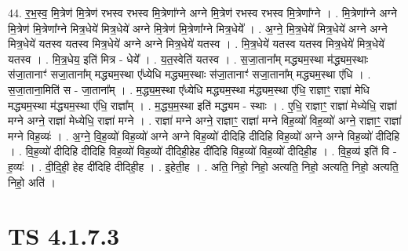 \documentclass[17pt]{extarticle}
\begin{document}
44. र॒भ॒स्व॒ मि॒त्रेण॑ मि॒त्रेण॑ रभस्व रभस्व मि॒त्रेणा᳚ग्ने अग्ने मि॒त्रेण॑ रभस्व रभस्व मि॒त्रेणा᳚ग्ने । . मि॒त्रेणा᳚ग्ने अग्ने मि॒त्रेण॑ मि॒त्रेणा᳚ग्ने मित्र॒धेये॑ मित्र॒धेये॑ अग्ने मि॒त्रेण॑ मि॒त्रेणा᳚ग्ने मित्र॒धेये᳚ । . अ॒ग्ने॒ मि॒त्र॒धेये॑ मित्र॒धेये॑ अग्ने अग्ने मित्र॒धेये॑ यतस्व यतस्व मित्र॒धेये॑ अग्ने अग्ने मित्र॒धेये॑ यतस्व । . मि॒त्र॒धेये॑ यतस्व यतस्व मित्र॒धेये॑ मित्र॒धेये॑ यतस्व । . मि॒त्र॒धेय॒ इति॑ मित्र - धेये᳚ । . य॒त॒स्वेति॑ यतस्व । . स॒जा॒ताना᳚म् मद्ध्यम॒स्था म॑द्ध्यम॒स्थाः स॑जा॒तानाꣳ॑ सजा॒ताना᳚म् मद्ध्यम॒स्था 
ए᳚ध्येधि मद्ध्यम॒स्थाः स॑जा॒तानाꣳ॑ सजा॒ताना᳚म् मद्ध्यम॒स्था ए॑धि । . स॒जा॒ताना॒मिति॑ स - जा॒ताना᳚म् । . म॒द्ध्य॒म॒स्था ए᳚ध्येधि मद्ध्यम॒स्था म॑द्ध्यम॒स्था ए॑धि॒ राज्ञाꣳ॒॒ राज्ञा॑ मेधि मद्ध्यम॒स्था म॑द्ध्यम॒स्था ए॑धि॒ राज्ञा᳚म् । . म॒द्ध्य॒म॒स्था इति॑ मद्ध्यम - स्थाः । . ए॒धि॒ राज्ञाꣳ॒॒ राज्ञा॑ मेध्येधि॒ राज्ञा॑ मग्ने अग्ने॒ राज्ञा॑ मेध्येधि॒ राज्ञा॑ मग्ने । . राज्ञा॑ मग्ने अग्ने॒ राज्ञाꣳ॒॒ राज्ञा॑ मग्ने विह॒व्यो॑ विह॒व्यो॑ अग्ने॒ राज्ञाꣳ॒॒ राज्ञा॑ मग्ने विह॒व्यः॑ । . अ॒ग्ने॒ वि॒ह॒व्यो॑ विह॒व्यो॑ अग्ने अग्ने विह॒व्यो॑ दीदिहि दीदिहि विह॒व्यो॑ अग्ने अग्ने विह॒व्यो॑ दीदिहि । . वि॒ह॒व्यो॑ दीदिहि दीदिहि विह॒व्यो॑ विह॒व्यो॑ दीदिही॒हेह दी॑दिहि विह॒व्यो॑ विह॒व्यो॑ दीदिही॒ह । . वि॒ह॒व्य॑ इति॑ वि - ह॒व्यः॑ । . दी॒दि॒ही॒ हेह दी॑दिहि दीदिही॒ह । . इ॒हेती॒ह । . अति॒ निहो॒ निहो॒ अत्यति॒ निहो॒ अत्यति॒ निहो॒ अत्यति॒ निहो॒ अति॑ । \newline
\pagebreak
{}

\section{ TS 4.1.7.3 }
\end{document}
